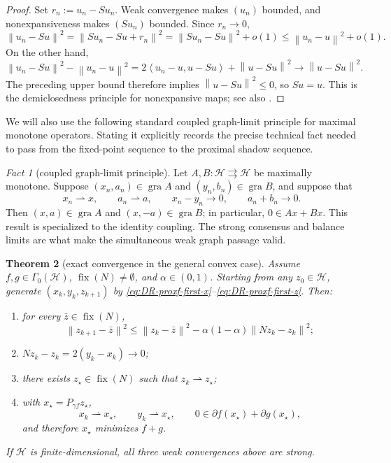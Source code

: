 \documentclass[10pt,leqno]{amsart}
\numberwithin{equation}{section}
\numberwithin{algorithm}{section}
\newtheorem{theorem}{Theorem}[section]
\theoremstyle{remark}
\newtheorem{fact}[theorem]{Fact}
\newcommand{\Hcal}{\mathcal{H}}
\newcommand{\Fix}{\operatorname{fix}}
\newcommand{\subd}{\partial}
\newcommand{\norm}[1]{\left\lVert #1 \right\rVert}
\newcommand{\ip}[2]{\left\langle #1,#2 \right\rangle}
\begin{document}
\begin{proof}
Set $r_n:=u_n-Su_n$.  Weak convergence makes $(u_n)$ bounded, and nonexpansiveness makes $(Su_n)$ bounded.  Since $r_n\to0$,
\[
  \norm{u_n-Su}^2
  =\norm{Su_n-Su+r_n}^2
  =\norm{Su_n-Su}^2+o(1)
  \le\norm{u_n-u}^2+o(1).
\]
On the other hand,
\[
  \norm{u_n-Su}^2-\norm{u_n-u}^2
  =2\ip{u_n-u}{u-Su}+\norm{u-Su}^2
  \longrightarrow\norm{u-Su}^2.
\]
The preceding upper bound therefore implies $\norm{u-Su}^2\le0$, so $Su=u$.  This is the demiclosedness principle for nonexpansive maps; see also \cite[Cor.~4.28]{BauschkeCombettes2017}.
\end{proof}

We will also use the following standard coupled graph-limit principle for maximal monotone operators.  Stating it explicitly records the precise technical fact needed to pass from the fixed-point sequence to the proximal shadow sequence.

\begin{fact}[coupled graph-limit principle]
\label{fact:coupled-graph-limit}
Let $A,B:\Hcal\rightrightarrows\Hcal$ be maximally monotone.  Suppose
$(x_n,a_n)\in\operatorname{gra}A$ and
$(y_n,b_n)\in\operatorname{gra}B$, and suppose that
\[
  x_n\rightharpoonup x,
  \qquad
  a_n\rightharpoonup a,
  \qquad
  x_n-y_n\to0,
  \qquad
  a_n+b_n\to0.
\]
Then $(x,a)\in\operatorname{gra}A$ and
$(x,-a)\in\operatorname{gra}B$; in particular,
$0\in Ax+Bx$.  This result is \cite[Cor.~26.6]{BauschkeCombettes2017} specialized to the identity coupling.  The strong consensus and balance limits are what make the simultaneous weak graph passage valid.
\end{fact}

\begin{theorem}[exact convergence in the general convex case]
\label{thm:general-convex-DR}
Assume $f,g\in\Gamma_0(\Hcal)$,
$\Fix(N)\ne\emptyset$, and $\alpha\in(0,1)$.  Starting from any
$z_0\in\Hcal$, generate $(x_k,y_k,z_{k+1})$ by
\eqref{eq:DR-proxf-first-x}--\eqref{eq:DR-proxf-first-z}.  Then:
\begin{enumerate}[label=\textup{(\roman*)}]
  \item for every $\bar z\in\Fix(N)$,
  \begin{equation}
  \label{eq:DR-Fejer-estimate}
    \norm{z_{k+1}-\bar z}^2
    \le\norm{z_k-\bar z}^2
    -\alpha(1-\alpha)\norm{Nz_k-z_k}^2;
  \end{equation}
  \item $Nz_k-z_k=2(y_k-x_k)\to0$;
  \item there exists $z_\star\in\Fix(N)$ such that
  $z_k\rightharpoonup z_\star$;
  \item with $x_\star=P_{\gamma f}z_\star$,
  \[
    x_k\rightharpoonup x_\star,
    \qquad
    y_k\rightharpoonup x_\star,
    \qquad
    0\in\subd f(x_\star)+\subd g(x_\star),
  \]
  and therefore $x_\star$ minimizes $f+g$.
\end{enumerate}
If $\Hcal$ is finite-dimensional, all three weak convergences above are strong.
\end{theorem}
\end{document}
